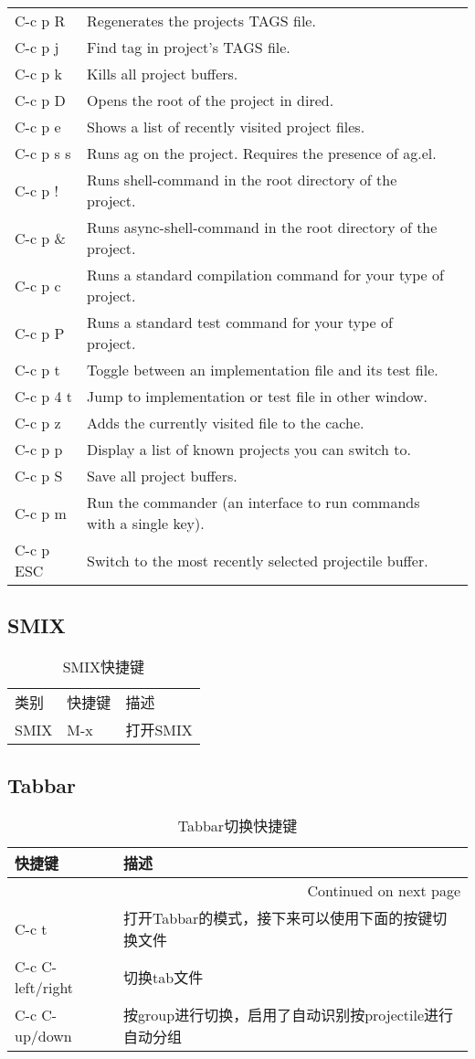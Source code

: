 \documentclass[10pt,a4paper]{article}
\begin{document}
\begin{longtable}{l|l|l}
C-c p R & Regenerates the projects TAGS file.\\
C-c p j & Find tag in project's TAGS file.\\
C-c p k & Kills all project buffers.\\
C-c p D & Opens the root of the project in dired.\\
C-c p e & Shows a list of recently visited project files.\\
C-c p s s & Runs ag on the project. Requires the presence of ag.el.\\
C-c p ! & Runs shell-command in the root directory of the project.\\
C-c p \& & Runs async-shell-command in the root directory of the project.\\
C-c p c & Runs a standard compilation command for your type of project.\\
C-c p P & Runs a standard test command for your type of project.\\
C-c p t & Toggle between an implementation file and its test file.\\
C-c p 4 t & Jump to implementation or test file in other window.\\
C-c p z & Adds the currently visited file to the cache.\\
C-c p p & Display a list of known projects you can switch to.\\
C-c p S & Save all project buffers.\\
C-c p m & Run the commander (an interface to run commands with a single key).\\
C-c p ESC & Switch to the most recently selected projectile buffer.\\
\end{longtable}

\subsection{SMIX}
\label{sec-3-9}
\begin{longtable}{l|l|l}
\caption{SMIX快捷键}
\\
类别 & 快捷键 & 描述\\
SMIX & M-x & 打开SMIX\\
\end{longtable}

\subsection{Tabbar}
\label{sec-3-10}
\begin{longtable}{l|l}
\caption{Tabbar切换快捷键}
\\
快捷键 & 描述\\
\hline
\endhead
\hline\multicolumn{2}{r}{Continued on next page} \\
\endfoot
\endlastfoot
C-c t & 打开Tabbar的模式，接下来可以使用下面的按键切换文件\\
C-c C-left/right & 切换tab文件\\
C-c C-up/down & 按group进行切换，启用了自动识别按projectile进行自动分组\\
\end{longtable}
\end{document}
